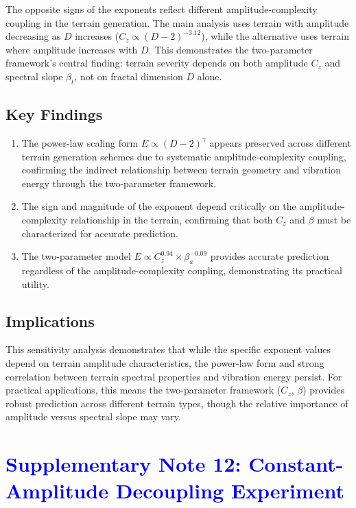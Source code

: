 \documentclass[11pt]{article}
\begin{document}
The opposite signs of the exponents reflect different amplitude-complexity coupling in the terrain generation. The main analysis uses terrain with amplitude decreasing as $D$ increases ($C_z \propto (D-2)^{-3.12}$), while the alternative uses terrain where amplitude increases with $D$. This demonstrates the two-parameter framework's central finding: terrain severity depends on both amplitude $C_z$ and spectral slope $\beta_t$, not on fractal dimension $D$ alone.

\subsection{Key Findings}

\begin{enumerate}
\item The power-law scaling form $E \propto (D-2)^\gamma$ appears preserved across different terrain generation schemes due to systematic amplitude-complexity coupling, confirming the indirect relationship between terrain geometry and vibration energy through the two-parameter framework.

\item The sign and magnitude of the exponent depend critically on the amplitude-complexity relationship in the terrain, confirming that both $C_z$ and $\beta$ must be characterized for accurate prediction.

\item The two-parameter model $E \propto C_z^{0.94} \times \beta_a^{-0.09}$ provides accurate prediction regardless of the amplitude-complexity coupling, demonstrating its practical utility.
\end{enumerate}

\subsection{Implications}

This sensitivity analysis demonstrates that while the specific exponent values depend on terrain amplitude characteristics, the power-law form and strong correlation between terrain spectral properties and vibration energy persist. For practical applications, this means the two-parameter framework ($C_z$, $\beta$) provides robust prediction across different terrain types, though the relative importance of amplitude versus spectral slope may vary.


\section{\textcolor{blue}{Supplementary Note 12: Constant-Amplitude Decoupling Experiment}}
\end{document}
